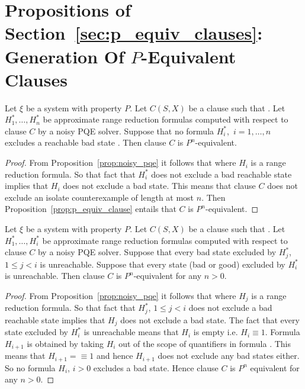 \section*{Propositions of Section~\ref{sec:p_equiv_clauses}: Generation Of $P$-Equivalent Clauses}
\begin{proposition}
Let $\xi$ be a system with property $P$. Let $C(S,X)$ be a clause such
that . Let $H^*_1,\dots,H^*_n$ be approximate
range reduction formulas computed with respect to clause $C$ by a
noisy PQE solver.  Suppose that no formula $H^*_i$,~$i=1,\dots,n$
excludes a reachable bad state . Then clause $C$ is
$P^n$-equivalent.
\end{proposition}
\begin{proof}
From Proposition~\ref{prop:noisy_pqe} it follows
that  where $H_i$ is a range reduction formula.  So
that fact that $H^*_i$ does not exclude a bad reachable state implies
that $H_i$ does not exclude a bad state. This means that clause $C$
does not exclude an isolate counterexample of length at most $n$. Then
Proposition~\ref{prop:p_equiv_clause} entails that $C$ is
$P^n$-equivalent.
\end{proof}

\begin{proposition}
Let $\xi$ be a system with property $P$. Let $C(S,X)$ be a clause such
that . Let $H^*_1,\dots,H^*_i$ be approximate
range reduction formulas computed with respect to clause $C$ by a
noisy PQE solver. Suppose that every bad state excluded by $H^*_j$, $1
\leq j < i$ is unreachable. Suppose that every state (bad or good)
excluded by $H^*_i$ is unreachable. Then clause $C$ is
$P^n$-equivalent for any $n > 0$.
\end{proposition}
\begin{proof}
From Proposition~\ref{prop:noisy_pqe} it follows
that  where $H_j$ is a range reduction formula.  So
that fact that $H^*_j$, $1 \leq j < i$ does not exclude a bad
reachable state implies that $H_j$ does not exclude a bad state.  The
fact that every state excluded by $H^*_i$ is unreachable means that
$H_i$ is empty i.e. $H_i \equiv 1$. Formula $H_{i+1}$ is obtained by
taking $H_i$ out of the scope of quantifiers in
formula . This means that
$H_{i+1} = \equiv 1$ and hence $H_{i+1}$ does not exclude any bad states
either. So no formula $H_i$, $i > 0$ excludes a bad state. Hence clause
$C$ is $P^n$ equivalent for any $n > 0$.
\end{proof}
